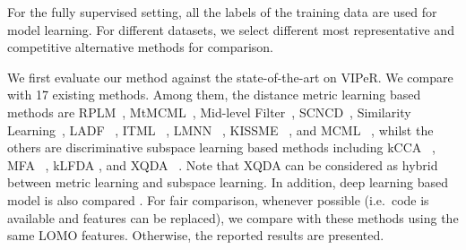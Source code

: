 \documentclass[10pt,twocolumn,letterpaper]{article}
\begin{document}
 For the fully supervised setting, all the labels of the training data are used for model learning. For different datasets, we select different most representative and competitive alternative methods for comparison.



 \quad We first evaluate our method against the state-of-the-art on VIPeR. We compare with 17 existing methods. Among them, the distance metric learning based methods are  RPLM~\cite{hirzer2012relaxed}, MtMCML~\cite{ma2014person}, Mid-level Filter~\cite{zhao2014learning}, SCNCD~\cite{yang2014salient}, Similarity Learning~\cite{chen2015similarity}, LADF ~\cite{li2013learning},  ITML ~\cite{davis2007information}, LMNN ~\cite{weinberger2005distance}, KISSME ~\cite{koestinger2012large}, and MCML ~\cite{MCML_GlobersonR05}, whilst the others are discriminative subspace learning based methods including kCCA ~\cite{lisanti2014matching}, MFA ~\cite{xiong2014person}, kLFDA \cite{xiong2014person}, and  XQDA ~\cite{liao2015person}. Note that XQDA can be considered as hybrid between metric learning and subspace learning. In addition, deep learning based model is also compared \cite{ahmed2015improved}.  For fair comparison, whenever possible (i.e.~code is available and features can be replaced), we compare with these methods using the same LOMO features. Otherwise, the reported results are presented. 
\end{document}
